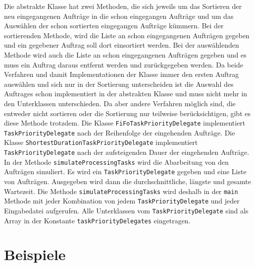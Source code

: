 \documentclass[a4paper,10pt,ngerman]{scrartcl}
\begin{document}
	Die abstrakte Klasse hat zwei Methoden, die sich jeweils um das Sortieren
	      der neu eingegangenen Aufträge in die schon eingegangen Aufträge
	      und um das Auswählen der schon sortierten eingegangen Aufträge kümmern.
	      Bei der sortierenden Methode, wird die Liste an schon eingegangenen Aufträgen gegeben
	      und ein gegebener Auftrag soll dort einsortiert werden.
	      Bei der auswählenden Methode wird auch die Liste an schon eingegangenen Aufträgen gegeben
	      und es muss ein Auftrag daraus entfernt werden und zurückgegeben werden.
	Da beide Verfahren und damit Implementationen der Klasse immer den ersten Auftrag auswählen
	      und sich nur in der Sortierung unterscheiden ist die Auswahl des Auftrages schon implementiert in der abstrakten Klasse
	      und muss nicht mehr in den Unterklassen unterschieden. Da aber andere Verfahren möglich sind,
	      die entweder nicht sortieren oder die Sortierung nur teilweise berücksichtigen, gibt es diese Methode trotzdem.
	Die Klasse \texttt{FiFoTaskPriorityDelegate} implementiert \texttt{TaskPriorityDelegate}
	      nach der Reihenfolge der eingehenden Aufträge.
	Die Klasse \texttt{ShortestDurationTaskPriorityDelegate} implementiert \texttt{TaskPriorityDelegate}
	      nach der aufsteigenden Dauer der eingehenden Aufträge.
	In der Methode \texttt{simulateProcessingTasks} wird die Abarbeitung von den Aufträgen simuliert.
	      Es wird ein \texttt{TaskPriorityDelegate} gegeben und eine Liste von Aufträgen.
	      Ausgegeben wird dann die durchschnittliche, längste und gesamte Wartezeit.
	Die Methode \texttt{simulateProcessingTasks} wird deshalb in der \texttt{main} Methode
	      mit jeder Kombination von jedem \texttt{TaskPriorityDelegate} und jeder Eingabedatei aufgerufen.
	      Alle Unterklassen vom \texttt{TaskPriorityDelegate} sind als Array
	      in der Konstante \texttt{taskPriorityDelegates} eingetragen.

\section{Beispiele}\label{sec:beispiele}
\end{document}
